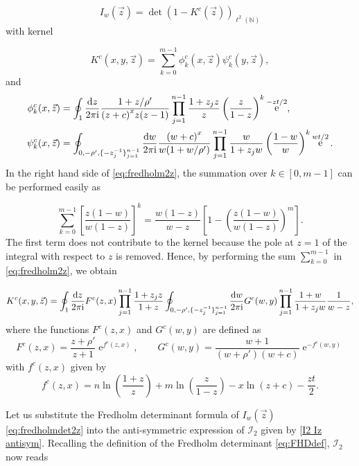 \documentclass[cmp]{svjour}
\numberwithin{theorem}{section}
\numberwithin{equation}{section}
\DeclareMathOperator{\e}{e}
\def\dd{{\rm d}}
\def\ii{{\rm i}}
\def\be{\begin{equation}}
\def\ee{\end{equation}}
\begin{document}
\begin{equation}
I_w(\vec{z}) = \det(1-K^c(\vec{z}))_{\ell^2(\mathbb{N})} \label{eq:fredholmdet2z}
\end{equation}
with kernel

\begin{equation}
K^c(x,y,\vec{z})=\sum_{k=0}^{m-1} \phi^c_k(x,\vec{z}) \psi^c_k(y,\vec{z}),
\label{eq:fredholm2z}
\end{equation}
and
\begin{align}
\phi^c_k(x,\vec{z}) &= \oint_1 \frac{\dd z}{2\pi\ii}
\frac{1+z/\rho'}{ {(z + c)}^x z (z-1)}
\prod_{j=1}^{n-1}\frac{1+z_jz}{z}
\left(\frac{z}{1-z}\right)^k \e^{-zt/2} ,
\label{phiform2a}
\\
\psi^c_k(x,\vec{z}) &=
\oint_{0,-\rho',\{-z_j^{-1}\}_{j=1}^{n-1}}
\frac{\dd w}{2\pi\ii}
\frac{ {(w + c)}^x }{w(1+w/\rho')}
\prod_{j=1}^{n-1}\frac{w}{1+z_jw}
\left(\frac{1-w}{w}\right)^{k} \e^{ wt/2}.
\label{psiform2a}
\end{align}
In the right hand side of \eqref{eq:fredholm2z}, the summation over $k \in [0,m-1]$ can be performed easily as

\begin{equation*}
    \sum_{k=0}^{m-1}{ {\left[ \frac{z(1-w)}{w(1-z)} \right] }^k} = \frac{w(1-z)}{w - z} \left[ 1 - {\left( \frac{z(1-w)}{w(1-z)} \right)}^m \right] .
\end{equation*}
The first term does not contribute to the kernel because the pole at $z=1$ of the integral with respect to $z$ is removed.
Hence, by performing the sum $\sum_{k=0}^{m-1}$ in \eqref{eq:fredholm2z}, we obtain 

\begin{equation*}
\label{Kxyz}
K^c(x,y,\vec{z}) =   \oint_{1} \frac{\dd z}{2 \pi \ii} F^c(z,x) \prod_{j=1}^{n-1}{ \frac{1 + z_j z}{1 + z} } \oint_{0 , - \rho' ,  \{ - z_j^{-1} \}_{j=1}^{n-1} } \frac{\dd w}{2 \pi \ii} G^c(w,y) \prod_{j=1}^{n-1}{\frac{1 + w}{1 + z_j w}} \frac{1}{w-z},
\end{equation*}
where the functions $F^c(z,x)$ and $G^c(w,y)$ are defined as
\be
\label{def:FcGc}
F^c(z , x) = \frac{z + \rho'}{z + 1} \e^{f^c(z , x)} , \qquad  G^c(w , y) = \frac{w + 1}{(w + \rho')(w + c)} \e^{ - f^c(w , y)}
\ee
with $f^c(z,x)$ given by
\be
\label{def:fc}
f^c(z,x) = n \ln{ \left( \frac{1 + z}{z} \right) } + m \ln{\left( \frac{z}{1 - z} \right)} - x \ln{(z + c)} - \frac{zt}{2}.
\ee

Let us substitute the Fredholm determinant formula of $I_w(\vec{z})$ \eqref{eq:fredholmdet2z} into the anti-symmetric expression of $\mathcal{I}_2$ given by \eqref{I2 Iz antisym}. Recalling the definition of the Fredholm determinant \eqref{eq:FHDdef}, $\mathcal{I}_2$ now reads
\end{document}
